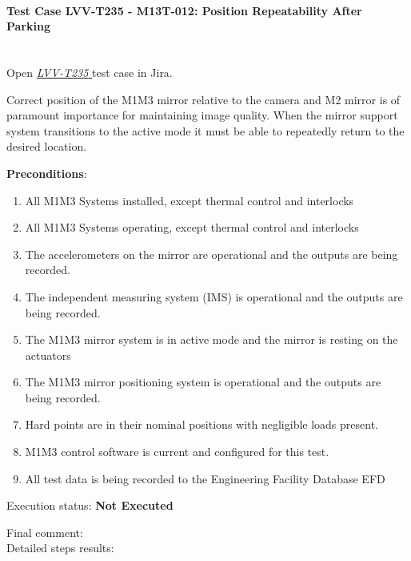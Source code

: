 \documentclass[SE,lsstdraft,STR,toc]{lsstdoc}
\providecommand{\tightlist}{
  \setlength{\itemsep}{0pt}\setlength{\parskip}{0pt}}
\begin{document}
\paragraph{Test Case LVV-T235 - M13T-012: Position Repeatability After Parking }\mbox{}\\

Open  \href{https://jira.lsstcorp.org/secure/Tests.jspa#/testCase/LVV-T235}{\textit{ LVV-T235 } }
test case in Jira.

Correct position of the M1M3 mirror relative to the camera and M2 mirror
is of paramount importance for maintaining image quality. When the
mirror support system transitions to the active mode it must be able to
repeatedly return to the desired location.

\textbf{ Preconditions}:\\
\begin{enumerate}
\tightlist
\item
  All M1M3 Systems installed, except thermal control and interlocks
\item
  All M1M3 Systems operating, except thermal control and interlocks
\item
  The accelerometers on the mirror are operational and the outputs are
  being recorded.
\item
  The independent measuring system (IMS) is operational and the outputs
  are being recorded.
\item
  The M1M3 mirror system is in active mode and the mirror is resting on
  the actuators
\item
  The M1M3 mirror positioning system is operational and the outputs are
  being recorded.
\item
  Hard points are in their nominal positions with negligible loads
  present.
\item
  M1M3 control software is current and configured for this test.
\item
  All test data is being recorded to the Engineering Facility Database
  EFD
\end{enumerate}

Execution status: {\bf Not Executed }

Final comment:\\


Detailed steps results:
\end{document}

